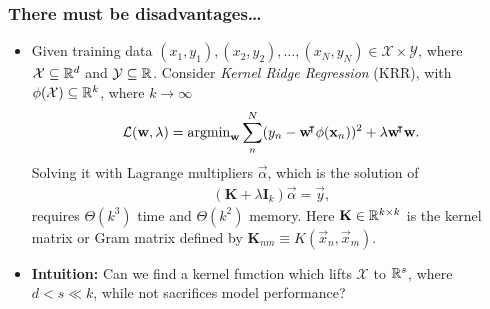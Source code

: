 \documentclass[10pt]{../formats/RU}
\begin{document}
\begin{frame}
  \frametitle{There must be disadvantages\ldots}
  \begin{itemize}
    \item<1-> Given training data $(x_1, y_1), (x_2, y_2), \ldots, (x_N, y_N) \in \mathcal{X}\times\mathcal{Y}$, where $\mathcal{X}\subseteq \mathbb{R}^d$ and $\mathcal{Y}\subseteq\mathbb{R}$. Consider \emph{Kernel Ridge Regression} (KRR), with $\phi(\mathcal{X})\subseteq \mathbb{R}^k$, where $k\rightarrow\infty$
    \begin{align*}
      \mathcal{L}(\mathbf{w}, \lambda)=\operatorname{\mathrm{argmin}}_{\mathbf{w}}\sum_{n}^{N}(y_n - \mathbf{w}{}^{\mkern-4mu\intercal}\phi(\mathbf{x}_n))^2 + \lambda\mathbf{w}{}^{\mkern-4mu\intercal}\mathbf{w}.
    \end{align*}
    Solving it with Lagrange multipliers $\vec{\alpha}$, which is the solution of
    \begin{align*}%
      (\mathbf{K}+\lambda\mathbf{I}_k)\vec{\alpha} = \vec{y},
    \end{align*} 
    requires $\Theta(k^3)$ time and $\Theta(k^2)$ memory. Here $\mathbf{K}\in \mathbb{R}^{k\times k}$ is the kernel matrix or Gram matrix defined by $\mathbf{K}_{nm} \equiv K(\vec{x}_n, \vec{x}_m)$.
    \item<2-> \textbf{Intuition:} Can we find a kernel function which lifts $\mathcal{X}$ to $\mathbb{R}^s$, where $d < s\ll k$, while not sacrifices model performance?
  \end{itemize}
\end{frame}
\end{document}
